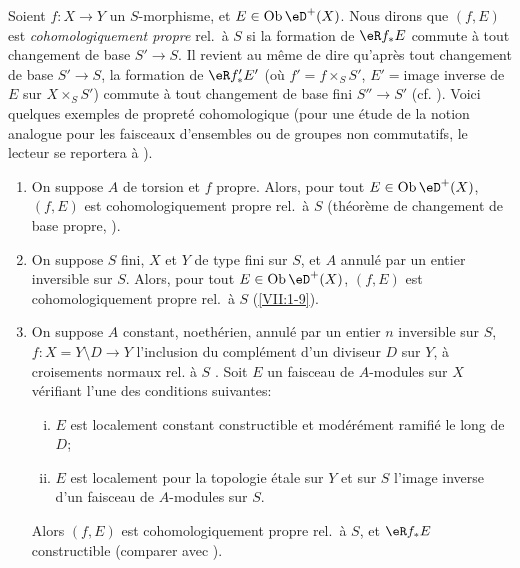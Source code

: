 Soient $f:X\to Y$ un $S$-morphisme, et $E\in\ob\eD^+(X)$. Nous dirons que 
$(f,E)$ est \emph{cohomologiquement propre} rel.\ à $S$ si la formation de 
$\eR f_\ast E$ commute à tout changement de base $S'\to S$. Il revient au 
même de dire qu'après tout changement de base $S'\to S$, la formation de 
$\eR f_\ast' E'$ (où $f'=f\times_S S'$, $E'=$image inverse de $E$ sur 
$X\times_S S'$) commute à tout changement de base fini $S'' \to S'$ (cf. 
\cite[XII 6.1]{sga4}). Voici quelques exemples de propreté cohomologique 
(pour une étude de la notion analogue pour les faisceaux d'ensembles ou de 
groupes non commutatifs, le lecteur se reportera à \cite[XIII]{sga1}). 
\begin{enumerate} %
  \item On suppose $A$ de torsion et $f$ propre. Alors, pour tout 
    $E\in\ob\eD^+(X)$, $(f,E)$ est cohomologiquement propre rel.\ à $S$ 
    (théorème de changement de base propre, \cite[XII 5.1]{sga4}). 
  \item On suppose $S$ fini, $X$ et $Y$ de type fini sur $S$, et $A$ annulé 
    par un entier inversible sur $S$. Alors, pour tout $E\in\ob\eD^+(X)$, 
    $(f,E)$ est cohomologiquement propre rel.\ à $S$ 
    (\ref{VII:1-9}). 
  \item On suppose $A$ constant, noethérien, annulé par un entier $n$ 
    inversible sur $S$, $f:X=Y\setminus D\to Y$ l'inclusion du complément 
    d'un diviseur $D$ sur $Y$, à croisements normaux rel. à $S$ 
    \cite[XIII 2.1]{sga1}. Soit $E$ un faisceau de $A$-modules sur $X$ 
    vérifiant l'une des conditions suivantes: 
    \begin{enumerate}[(i)]
      \item $E$ est localement constant constructible et modérément 
        ramifié le long de $D$; 
      \item $E$ est localement pour la topologie étale sur $Y$ et sur $S$ 
        l'image inverse d'un faisceau de $A$-modules sur $S$. 
    \end{enumerate}
    Alors $(f,E)$ est cohomologiquement propre rel.\ à $S$, et $\eR f_\ast E$ 
    constructible (comparer avec \cite[XIII 2.4]{sga1}). 
\end{enumerate} 

